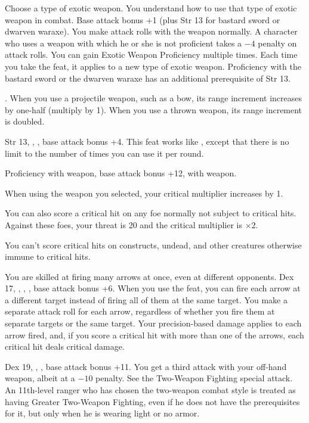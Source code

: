 {Choose a type of exotic weapon. You understand how to use that type of exotic weapon in combat.}
{Base attack bonus +1 (plus Str 13 for bastard sword or dwarven waraxe).}
{You make attack rolls with the weapon normally.}
{A character who uses a weapon with which he or she is not proficient takes a $-4$ penalty on attack rolls.}
{You can gain Exotic Weapon Proficiency multiple times. Each time you take the feat, it applies to a new type of exotic weapon. Proficiency with the bastard sword or the dwarven waraxe has an additional prerequisite of Str 13.}

{.}
{When you use a projectile weapon, such as a bow, its range increment increases by one-half (multiply by 1\onehalf). When you use a thrown weapon, its range increment is doubled.}

{Str 13, , , base attack bonus +4.}
{This feat works like , except that there is no limit to the number of times you can use it per round.}

{}
{Proficiency with weapon, base attack bonus +12,  with weapon.}
{When using the weapon you selected, your critical multiplier increases by 1.

You can also score a critical hit on any foe normally not subject to critical hits. Against these foes, your threat is 20 and the critical multiplier is $\times2$.}
{You can't score critical hits on constructs, undead, and other creatures otherwise immune to critical hits.}
{}

{You are skilled at firing many arrows at once, even at different opponents.}
{Dex 17, , , , base attack bonus +6.}
{When you use the  feat, you can fire each arrow at a different target instead of firing all of them at the same target. You make a separate attack roll for each arrow, regardless of whether you fire them at separate targets or the same target. Your precision-based damage applies to each arrow fired, and, if you score a critical hit with more than one of the arrows, each critical hit deals critical damage.}{}{}

{}
{Dex 19, , , base attack bonus +11.}
{You get a third attack with your off-hand weapon, albeit at a $-10$ penalty. See the Two-Weapon Fighting special attack.}{}
{An 11th-level ranger who has chosen the two-weapon combat style is treated as having Greater Two-Weapon Fighting, even if he does not have the prerequisites for it, but only when he is wearing light or no armor.}

